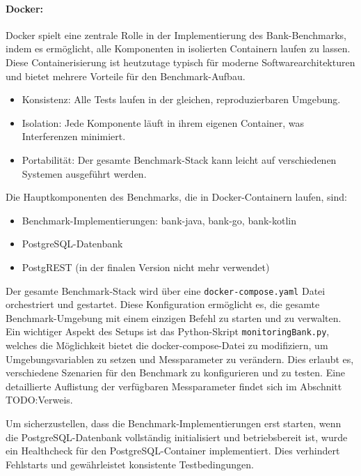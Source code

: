 \documentclass[fontsize=12pt,paper=a4,twoside=semi,parskip=half-,headsepline,headinclude]{scrreprt}
\begin{document}
\paragraph{Docker:}

Docker spielt eine zentrale Rolle in der Implementierung des Bank-Bench\-marks, indem es ermöglicht, alle Komponenten in isolierten Containern laufen zu lassen. Diese Containerisierung ist heutzutage typisch für moderne Softwarearchitekturen und bietet mehrere Vorteile für den Benchmark-Aufbau.

\begin{itemize}
	\item Konsistenz: Alle Tests laufen in der gleichen, reproduzierbaren Umgebung.
	\item Isolation: Jede Komponente läuft in ihrem eigenen Container, was Interferenzen minimiert.
	\item Portabilität: Der gesamte Benchmark-Stack kann leicht auf verschiedenen Systemen ausgeführt werden.
\end{itemize}

Die Hauptkomponenten des Benchmarks, die in Docker-Containern laufen, sind:

\begin{itemize}
	\item Benchmark-Implementierungen: bank-java, bank-go, bank-kotlin
	\item PostgreSQL-Datenbank
	\item PostgREST (in der finalen Version nicht mehr verwendet)
\end{itemize}

Der gesamte Benchmark-Stack wird über eine \texttt{docker-compose.yaml} Datei orchestriert und gestartet. Diese Konfiguration ermöglicht es, die gesamte Benchmark-Umgebung mit einem einzigen Befehl zu starten und zu verwalten.
Ein wichtiger Aspekt des Setups ist das Python-Skript \texttt{monitoringBank.py}, welches die Möglichkeit bietet die docker-compose-Datei zu modifiziern, um Umgebungsvariablen zu setzen und Messparameter zu verändern. Dies erlaubt es, verschiedene Szenarien für den Benchmark zu konfigurieren und zu testen. Eine detaillierte Auflistung der verfügbaren Messparameter findet sich im Abschnitt TODO:Verweis.

Um sicherzustellen, dass die Benchmark-Implementierungen erst starten, wenn die Post\-greSQL-Datenbank vollständig initialisiert und betriebsbereit ist, wurde ein Healthcheck für den PostgreSQL-Container implementiert. Dies verhindert Fehlstarts und ge\-währ\-leis\-tet konsistente Testbedingungen.
\end{document}
